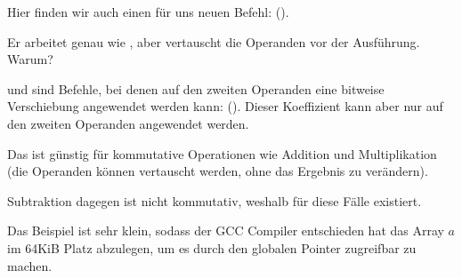 Hier finden wir auch einen für uns neuen Befehl: \RSB ().

Er arbeitet genau wie \SUB, aber vertauscht die Operanden vor der Ausführung. Warum?

\SUB und \RSB  sind Befehle, bei denen auf den zweiten Operanden eine bitweise Verschiebung angewendet werden kann:
().
Dieser Koeffizient kann aber nur auf den zweiten Operanden angewendet werden.

Das ist günstig für kommutative Operationen wie Addition und Multiplikation (die Operanden können vertauscht werden,
ohne das Ergebnis zu verändern).

Subtraktion dagegen ist nicht kommutativ, weshalb für diese Fälle \RSB existiert.


Das Beispiel ist sehr klein, sodass der GCC Compiler entschieden hat das Array $a$ im 64KiB Platz abzulegen, um es durch
den globalen Pointer zugreifbar zu machen.



